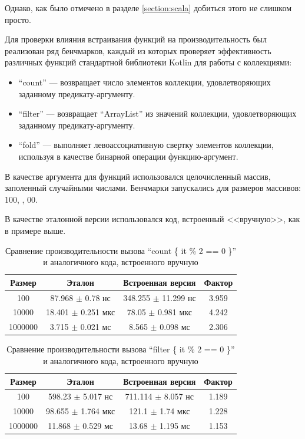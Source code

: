 Однако, как было отмечено в разделе \ref{section:scala} добиться этого не слишком просто.

Для проверки влияния встраивания функций на производительность был реализован ряд бенчмарков,
каждый из которых проверяет эффективность различных функций стандартной библиотеки Kotlin
для работы с коллекциями:
\begin{itemize}
    \item ``count'' --- возвращает число элементов коллекции, удовлетворяющих заданному
    предикату-аргументу.
    \item ``filter'' --- возвращает ``ArrayList'' из значений коллекции, удовлетворяющих заданному
    предикату-аргументу.
    \item ``fold'' --- выполняет левоассоциативную свертку элементов коллекции, используя
    в качестве бинарной операции функцию-аргумент.
\end{itemize}

В качестве аргумента для функций использовался целочисленный массив, заполенный случайными числами.
Бенчмарки запускались для размеров массивов: 100, , 00.

В качестве эталонной версии использовался код, встроенный <<вручную>>, как в примере выше.

\begin{table}[h]
\begin{center}
\begin{tabular}{|c|c|c|c|} \hline
Размер & Эталон & Встроенная версия & Фактор \\ \hline
100 & 87.968 $\pm$ 0.78 нс & 348.255 $\pm$ 11.299 нс & 3.959\\ \hline
10000 & 18.401 $\pm$ 0.251 мкс & 78.05 $\pm$ 0.981 мкс & 4.242\\ \hline
1000000 & 3.715 $\pm$ 0.021 мс & 8.565 $\pm$ 0.098 мс & 2.306\\ \hline
\end{tabular}
\caption{Сравнение производительности вызова ``count \{ it \% 2 == 0 \}'' и аналогичного кода, встроенного вручную}
\label{bm:count}
\end{center}
\end{table}

\begin{table}[h]
\begin{center}
\begin{tabular}{|c|c|c|c|} \hline
Размер & Эталон & Встроенная версия & Фактор \\ \hline
100 & 598.23 $\pm$ 5.017 нс & 711.114 $\pm$ 8.057 нс & 1.189\\ \hline
10000 & 98.655 $\pm$ 1.764 мкс & 121.1 $\pm$ 1.74 мкс & 1.228\\ \hline
1000000 & 11.868 $\pm$ 0.529 мс & 13.68 $\pm$ 1.195 мс & 1.153\\ \hline
\end{tabular}
\caption{Сравнение производительности вызова ``filter \{ it \% 2 == 0 \}'' и аналогичного кода, встроенного вручную}
\label{bm:filter}
\end{center}
\end{table}

